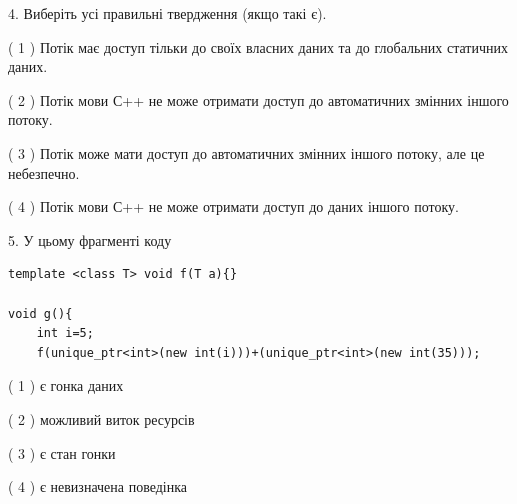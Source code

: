 \documentclass[12pt, ukrainian]{article}
\begin{document}
\begin {large}
{%
4. Виберіть усі правильні твердження (якщо такі є).\par
\vspace{2mm}

( 1 ) Потік має доступ тільки до своїх власних даних та до глобальних статичних даних.%

( 2 ) Потік мови С++ не може отримати доступ до автоматичних змінних іншого потоку.%

( 3 ) Потік може мати доступ до автоматичних змінних іншого потоку, але це небезпечно.%

( 4 ) Потік мови С++ не може отримати доступ до даних іншого потоку.%


5. У цьому фрагменті коду
\begin{verbatim}
template <class T> void f(T a){}

void g(){
    int i=5;
    f(unique_ptr<int>(new int(i)))+(unique_ptr<int>(new int(35)));
\end{verbatim}
( 1 ) є гонка даних%

( 2 ) можливий виток ресурсів%

( 3 ) є стан гонки%

( 4 ) є невизначена поведінка%
}
\end {large}
\end{document}
